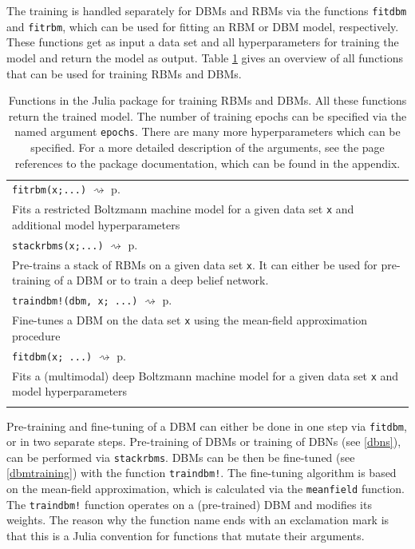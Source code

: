 \documentclass[12pt]{article}
\newcommand{\inlinecode}[1]{\texttt{#1}}
\newcommand{\rightpageref}[1]{\hfill $\rightsquigarrow$ p.\ \pageref{#1}}
\begin{document}
The training is handled separately for DBMs and RBMs via the functions \inlinecode{fitdbm} and \inlinecode{fitrbm}, which can be used for fitting an RBM or DBM model, respectively.
These functions get as input a data set and all hyperparameters for training the model and return the model as output.
Table \ref{juliaFunTableTrain} gives an overview of all functions that can be used for training RBMs and DBMs.



\begin{table}[h]
\caption{Functions in the Julia package for training RBMs and DBMs. All these functions return the trained model. The number of training epochs can be specified via the named argument \inlinecode{epochs}. There are many more hyperparameters which can be specified. For a more detailed description of the arguments, see the page references to the package documentation, which can be found in the appendix.}\label{juliaFunTableTrain}
\begin{tabularx}{\textwidth}{X}
 \Xhline{1pt}
   \inlinecode{fitrbm(x;...)} \rightpageref{bms_fitrbm} \\
   Fits a restricted Boltzmann machine model for a given data set \inlinecode{x} and additional model hyperparameters \\
   \inlinecode{stackrbms(x;...)} \rightpageref{bms_stackrbms}\\
   Pre-trains a stack of RBMs on a given data set \inlinecode{x}. It can either be used for pre-training of a DBM or to train a deep belief network. \\
   \inlinecode{traindbm!(dbm, x; ...)} \rightpageref{bms_traindbm!} \\
   Fine-tunes a DBM on the data set \inlinecode{x} using the mean-field approximation procedure \\
     \inlinecode{fitdbm(x; ...)} \rightpageref{bms_fitdbm} \\
   Fits a (multimodal) deep Boltzmann machine model for a given data set \inlinecode{x} and model hyperparameters \\
 \Xhline{1pt}
\end{tabularx}
\end{table}

Pre-training and fine-tuning of a DBM can either be done in one step via \inlinecode{fitdbm}, or in two separate steps.
Pre-training of DBMs or training of DBNs (see \ref{dbns}), can be performed via \inlinecode{stackrbms}.
DBMs  can be then be fine-tuned (see \ref{dbmtraining}) with the function \inlinecode{traindbm!}.
The fine-tuning algorithm is based on the mean-field approximation, which is calculated via the \inlinecode{meanfield} function.
The \inlinecode{traindbm!} function operates on a (pre-trained) DBM and modifies its weights.
The reason why the function name ends with an exclamation mark is that this is a Julia convention for functions that mutate their arguments.
\end{document}
